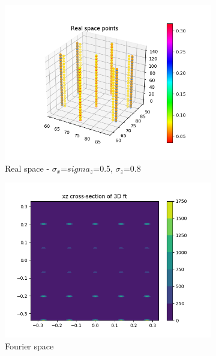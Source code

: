\documentclass{article}
\begin{document}
\begin{figure}[h]
	\begin{subfigure}{0.45\textwidth}
                \centering
                \includegraphics[width=\textwidth]{real_3d_hex_highsig.png}
                \caption{Real space - $\sigma_x$=$sigma_z$=0.5, $\sigma_z$=0.8}\label{fig:real_3d_hex_highsig}
        \end{subfigure}
        \begin{subfigure}{0.45\textwidth}
                \centering
                \includegraphics[width=\textwidth]{fourier_3d_hex_highsig.png}
                \caption{Fourier space}\label{fig:fourier_3d_hex_highsig}
        \end{subfigure}

	\caption{}\label{fig:hex_simple}
\end{figure}  
\end{document}

